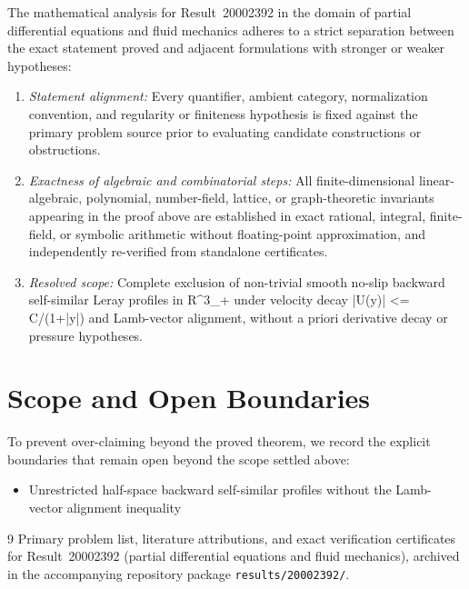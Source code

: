 \documentclass[10pt,reqno]{amsart}
\theoremstyle{definition}
\begin{document}
The mathematical analysis for Result~20002392 in the domain of partial differential equations and fluid mechanics adheres to a strict separation between the exact statement proved and adjacent formulations with stronger or weaker hypotheses:
\begin{enumerate}[label=\textup{(\alph*)}]
  \item \emph{Statement alignment:} Every quantifier, ambient category, normalization convention, and regularity or finiteness hypothesis is fixed against the primary problem source prior to evaluating candidate constructions or obstructions.
  \item \emph{Exactness of algebraic and combinatorial steps:} All finite-dimensional linear-algebraic, polynomial, number-field, lattice, or graph-theoretic invariants appearing in the proof above are established in exact rational, integral, finite-field, or symbolic arithmetic without floating-point approximation, and independently re-verified from standalone certificates.
  \item \emph{Resolved scope:} Complete exclusion of non-trivial smooth no-slip backward self-similar Leray profiles in R\textasciicircum{}3\_+ under velocity decay |U(y)| <= C/(1+|y|) and Lamb-vector alignment, without a priori derivative decay or pressure hypotheses.
\end{enumerate}

\section{Scope and Open Boundaries}

To prevent over-claiming beyond the proved theorem, we record the explicit boundaries that remain open beyond the scope settled above:
\begin{itemize}
  \item Unrestricted half-space backward self-similar profiles without the Lamb-vector alignment inequality
\end{itemize}

\begin{thebibliography}{9}
Primary problem list, literature attributions, and exact verification certificates for Result~20002392 (partial differential equations and fluid mechanics), archived in the accompanying repository package \texttt{results/20002392/}.
\end{thebibliography}
\end{document}
